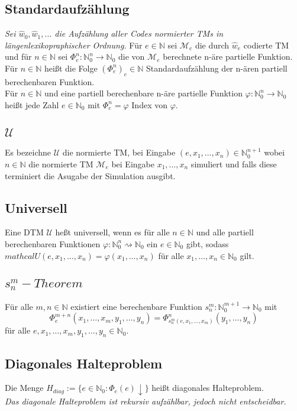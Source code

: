 \documentclass[DIV=15]{scrartcl}
\begin{document}
\subsection{Standardaufzählung}
    \textit{Sei \(\hat{w}_0,\hat{w}_1,\dots\) die Aufzählung aller Codes normierter TMs in längenlexikopraphischer Ordnung.}\bigskip
    Für \(e\in\mathbb{N}\) sei \(\mathcal{M}_e\) die durch \(\hat{w}_e\) codierte TM und für \(n\in\mathbb{N}\) sei \(\Phi_e^n:\mathbb{N}_0^n\to\mathbb{N}_0\)
    die von \(\mathcal{M}_e\) berechnete n-äre partielle Funktion.\\
    Für \(n\in\mathbb{N}\) heißt die Folge \((\Phi_e^n)_e\in\mathbb{N}\) Standardaufzählung der n-ären partiell berechenbaren Funktion.\\
    Für \(n\in\mathbb{N}\) und eine partiell berechenbare n-äre partielle Funktion \(\varphi:\mathbb{N}_0^n\to\mathbb{N}_0\) heißt jede Zahl 
    \(e\in\mathbb{N}_0\) mit \(\Phi_e^n=\varphi\) Index von \(\varphi\).
\subsection{\(\mathcal{U}\)}
    Es bezeichne \(\mathcal{U}\) die normierte TM, bei Eingabe \((e,x_1,\dots,x_n)\in\mathbb{N}_0^{n+1}\) wobei \(n\in\mathbb{N}\) die normierte TM \(\mathcal{M}_e\)
    bei Eingabe \(x_1,\dots,x_n\) simuliert und falls diese terminiert die Asugabe der Simulation ausgibt.
\subsection{Universell}
    Eine DTM \(\mathcal{U}\) heßt universell, wenn es für alle \(n\in\mathbb{N}\) und alle partiell berechenbaren Funktionen \(\varphi:\mathbb{N}_0^n\rightsquigarrow\mathbb{N}_0\) 
    ein \(e\in\mathbb{N}_0\) gibt, sodass \(mathcal{U}(e,x_1,\dots,x_n)=\varphi(x_1,\dots,x_n)\) für alle \(x_1,\dots,x_n\in\mathbb{N}_0\) gilt.
\subsection{\(s_n^m-Theorem\)}
    Für alle \(m,n\in\mathbb{N}\) existiert eine berechenbare Funktion \(s_n^m:\mathbb{N}_0^{m+1}\to\mathbb{N}_0\) mit 
    \[\Phi_e^{m+n}(x_1,\dots,x_m,y_1,\dots,y_n)=\Phi^n_{s_n^m(e,x_1,\dots,x_m)}(y_1,\dots,y_n)\]
    für alle \(e,x_1,\dots,x_m,y_1,\dots,y_n\in\mathbb{N}_0\).
\subsection{Diagonales Halteproblem}
    Die Menge \(H_{diag}:=\{e\in\mathbb{N}_0:\Phi_e(e)\downarrow\}\) heißt diagonales Halteproblem.\\
    \textit{Das diagonale Halteproblem ist rekursiv aufzählbar, jedoch nicht entscheidbar.}
\end{document}
